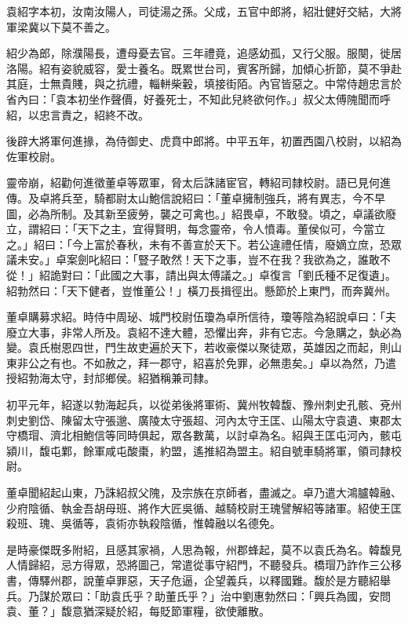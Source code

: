 
\begin{pinyinscope}
袁紹字本初，汝南汝陽人，司徒湯之孫。父成，五官中郎將，紹壯健好交結，大將軍梁冀以下莫不善之。

紹少為郎，除濮陽長，遭母憂去官。三年禮竟，追感幼孤，又行父服。服闋，徙居洛陽。紹有姿貌威容，愛士養名。既累世台司，賓客所歸，加傾心折節，莫不爭赴其庭，士無貴賤，與之抗禮，輜軿柴轂，填接街陌。內官皆惡之。中常侍趙忠言於省內曰：「袁本初坐作聲價，好養死士，不知此兒終欲何作。」叔父太傅隗聞而呼紹，以忠言責之，紹終不改。

後辟大將軍何進掾，為侍御史、虎賁中郎將。中平五年，初置西園八校尉，以紹為佐軍校尉。

靈帝崩，紹勸何進徵董卓等眾軍，脅太后誅諸宦官，轉紹司隸校尉。語已見何進傳。及卓將兵至，騎都尉太山鮑信說紹曰：「董卓擁制強兵，將有異志，今不早圖，必為所制。及其新至疲勞，襲之可禽也。」紹畏卓，不敢發。頃之，卓議欲廢立，謂紹曰：「天下之主，宜得賢明，每念靈帝，令人憤毒。董侯似可，今當立之。」紹曰：「今上富於春秋，未有不善宣於天下。若公違禮任情，廢嫡立庶，恐眾議未安。」卓案劍叱紹曰：「豎子敢然！天下之事，豈不在我？我欲為之，誰敢不從！」紹詭對曰：「此國之大事，請出與太傅議之。」卓復言「劉氏種不足復遺」。紹勃然曰：「天下健者，豈惟董公！」橫刀長揖徑出。懸節於上東門，而奔冀州。

董卓購募求紹。時侍中周珌、城門校尉伍瓊為卓所信待，瓊等陰為紹說卓曰：「夫廢立大事，非常人所及。袁紹不達大體，恐懼出奔，非有它志。今急購之，埶必為變。袁氏樹恩四世，門生故吏遍於天下，若收豪傑以聚徒眾，英雄因之而起，則山東非公之有也。不如赦之，拜一郡守，紹喜於免罪，必無患矣。」卓以為然，乃遣授紹勃海太守，封邟鄉侯。紹猶稱兼司隸。

初平元年，紹遂以勃海起兵，以從弟後將軍術、冀州牧韓馥、豫州刺史孔骸、兗州刺史劉岱、陳留太守張邈、廣陵太守張超、河內太守王匡、山陽太守袁遺、東郡太守橋瑁、濟北相鮑信等同時俱起，眾各數萬，以討卓為名。紹與王匡屯河內，骸屯潁川，馥屯鄴，餘軍咸屯酸棗，約盟，遙推紹為盟主。紹自號車騎將軍，領司隸校尉。

董卓聞紹起山東，乃誅紹叔父隗，及宗族在京師者，盡滅之。卓乃遣大鴻臚韓融、少府陰循、執金吾胡母班、將作大匠吳循、越騎校尉王瑰譬解紹等諸軍。紹使王匡殺班、瑰、吳循等，袁術亦執殺陰循，惟韓融以名德免。

是時豪傑既多附紹，且感其家禍，人思為報，州郡蜂起，莫不以袁氏為名。韓馥見人情歸紹，忌方得眾，恐將圖己，常遣從事守紹門，不聽發兵。橋瑁乃詐作三公移書，傳驛州郡，說董卓罪惡，天子危逼，企望義兵，以釋國難。馥於是方聽紹舉兵。乃謀於眾曰：「助袁氏乎？助董氏乎？」治中劉惠勃然曰：「興兵為國，安問袁、董？」馥意猶深疑於紹，每貶節軍糧，欲使離散。


\end{pinyinscope}
